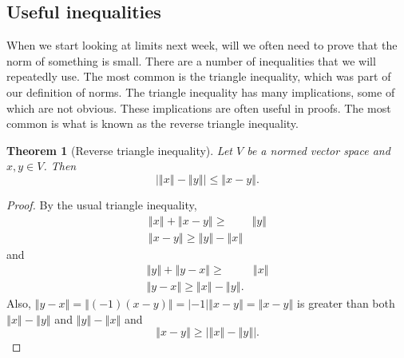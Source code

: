 \documentclass[12pt,reqno]{amsart}
\newtheorem{theorem}{Theorem}[section]
\theoremstyle{definition}
\newcommand{\norm}[1]{\left\Vert {#1} \right\Vert}
\begin{document}
\subsection{Useful inequalities}
When we start looking at limits next week, will we often need to prove
that the norm of something is small. There are a number of
inequalities that we will repeatedly use. The most common is the
triangle inequality, which was part of our definition of norms.  The
triangle inequality has many implications, some of which are not
obvious. These implications are often useful in proofs. The most
common is what is known as the reverse triangle inequality.
\begin{theorem}[Reverse triangle inequality]
  Let $V$ be a normed vector space and $x,y \in V$. Then
  \[ \left| \norm{x} - \norm{y} \right| \leq \norm{x-y}. \]
\end{theorem}
\begin{proof}
  By the usual triangle inequality,
  \begin{align*}
    \norm{x} + \norm{x-y} \geq & \norm{y} \\
    \norm{x-y} \geq \norm{y} - \norm{x}
  \end{align*}
  and
  \begin{align*}
    \norm{y} + \norm{y-x} \geq & \norm{x} \\
    \norm{y-x} \geq \norm{x} - \norm{y}.
  \end{align*}
  Also, $\norm{y-x} = \norm{(-1)(x-y)} = |-1| \norm{x-y} =
  \norm{x-y}$ is greater than both $\norm{x}-\norm{y}$ and
  $\norm{y}-\norm{x}$ and 
  \[ \norm{x-y} \geq \left| \norm{x} - \norm{y} \right|. \]
\end{proof}
\end{document}
